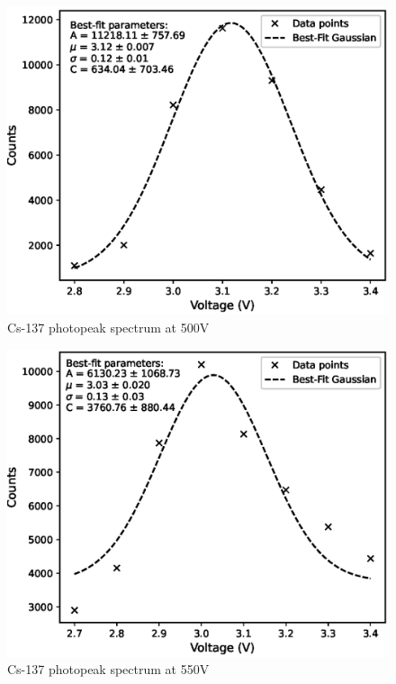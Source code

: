\begin{figure}[H]
    \centering
    \includegraphics[width=0.9\columnwidth]{images/500.eps}
    \caption{Cs-137 photopeak spectrum at 500V}
    \label{500}
\end{figure}

\begin{figure}[H]
    \centering
    \includegraphics[width=0.9\columnwidth]{images/550.eps}
    \caption{Cs-137 photopeak spectrum at 550V}
    \label{550}
\end{figure}

